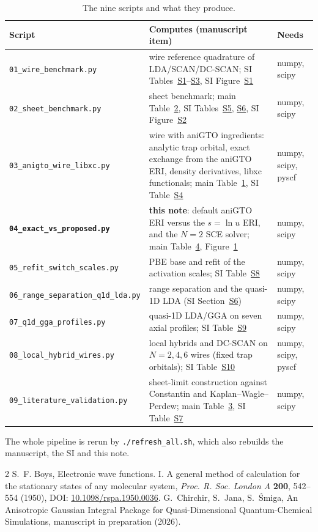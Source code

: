 \documentclass[11pt]{article}
\begin{document}
\begin{table}[H]
\centering
\caption{The nine scripts and what they produce.}
\label{n:tab:codes}
\small
\begin{tabular}{@{}p{5.6cm}p{7.6cm}p{2.0cm}@{}}
\toprule
Script & Computes (manuscript item) & Needs \\
\midrule
\texttt{01\_wire\_benchmark.py} & wire reference quadrature of LDA/SCAN/DC-SCAN; SI Tables~\href{si.pdf\#table.1}{S1}--\href{si.pdf\#table.3}{S3}, SI Figure~\href{si.pdf\#figure.caption.3}{S1} & numpy, scipy \\
\texttt{02\_sheet\_benchmark.py} & sheet benchmark; main Table~\href{main.pdf\#table.2}{2}, SI Tables~\href{si.pdf\#table.5}{S5}, \href{si.pdf\#table.6}{S6}, SI Figure~\href{si.pdf\#figure.caption.4}{S2} & numpy, scipy \\
\texttt{03\_anigto\_wire\_libxc.py} & wire with aniGTO ingredients: analytic trap orbital, exact exchange from the aniGTO ERI, density derivatives, libxc functionals; main Table~\href{main.pdf\#table.1}{1}, SI Table~\href{si.pdf\#table.4}{S4} & numpy, scipy, pyscf \\
\textbf{\texttt{04\_exact\_vs\_proposed.py}} & \textbf{this note}: default aniGTO ERI versus the $s=\ln u$ ERI, and the $N=2$ SCE solver; main Table~\href{main.pdf\#table.4}{4}, Figure~\href{main.pdf\#figure.caption.5}{1} & numpy, scipy \\
\texttt{05\_refit\_switch\_scales.py} & PBE base and refit of the activation scales; SI Table~\href{si.pdf\#table.8}{S8} & numpy, scipy \\
\texttt{06\_range\_separation\_q1d\_lda.py} & range separation and the quasi-1D LDA (SI Section~\href{si.pdf\#section.6}{S6}) & numpy, scipy \\
\texttt{07\_q1d\_gga\_profiles.py} & quasi-1D LDA/GGA on seven axial profiles; SI Table~\href{si.pdf\#table.9}{S9} & numpy, scipy \\
\texttt{08\_local\_hybrid\_wires.py} & local hybrids and DC-SCAN on $N=2,4,6$ wires (fixed trap orbitals); SI Table~\href{si.pdf\#table.10}{S10} & numpy, scipy, pyscf \\
\texttt{09\_literature\_validation.py} & sheet-limit construction against Constantin and Kaplan--Wagle--Perdew; main Table~\href{main.pdf\#table.3}{3}, SI Table~\href{si.pdf\#table.7}{S7} & numpy, scipy \\
\bottomrule
\end{tabular}
\end{table}

\noindent The whole pipeline is rerun by \texttt{./refresh\_all.sh}, which also rebuilds the manuscript, the SI
and this note.

\begin{thebibliography}{2}
 S.~F. Boys, Electronic wave functions. I. A general method of calculation for the
  stationary states of any molecular system, \emph{Proc. R. Soc. London A} \textbf{200}, 542--554 (1950),
  DOI: \href{https://doi.org/10.1098/rspa.1950.0036}{10.1098/rspa.1950.0036}.
 G.~Chirchir, S.~Jana, S.~\'Smiga, An Anisotropic Gaussian Integral Package for
  Quasi-Dimensional Quantum-Chemical Simulations, manuscript in preparation (2026).
\end{thebibliography}
\end{document}
